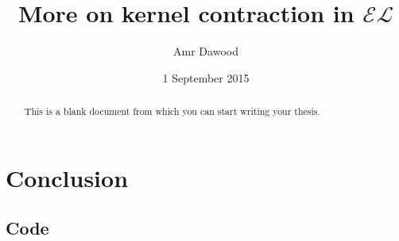 \documentclass{sfuthesis}
\title{More on kernel contraction in $\mathcal{EL}$}
\author{Amr Dawood}
\date{1 September 2015}
\theoremstyle{plain}
\theoremstyle{definition}
\begin{document}
\frontmatter
\maketitle{}
\makecommittee{}

\begin{abstract}
	This is a blank document from which you can start writing your thesis.
\end{abstract}


\begin{dedication} %
\end{dedication}


\begin{acknowledgements} %
\end{acknowledgements}

\tableofcontents\clearpage
{}\listoftables\clearpage
{}\listoffigures





%
%

\mainmatter%
















\chapter{Conclusion}




%
%
%
%
%

\backmatter%
	
	

\begin{appendices} %
	\chapter{Code}
\end{appendices}
\end{document}
